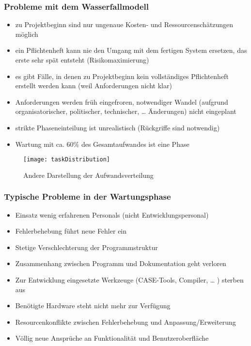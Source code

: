 	\subsubsection{Probleme mit dem Wasserfallmodell}
	\begin{itemize}
		\item zu Projektbeginn sind nur ungenaue Kosten- und Ressourcenschätzungen möglich
		\item ein Pflichtenheft kann nie den Umgang mit dem fertigen System ersetzen, das erste sehr spät entsteht (Risikomaximierung)
		\item es gibt Fälle, in denen zu Projektbeginn kein vollständiges Pflichtenheft erstellt werden kann (weil Anforderungen nicht klar)
		\item Anforderungen werden früh eingefroren, notwendiger Wandel (aufgrund organisatorischer, politischer, technischer, … Änderungen) nicht eingeplant
		\item strikte Phaseneinteilung ist unrealistisch (Rückgriffe sind notwendig)
		\item Wartung mit ca. 60\% des Gesamtaufwandes ist eine Phase
	\end{itemize}
	\begin{figure}[h]
		\centering
		\caption{Andere Darstellung der Aufwandsverteilung}
		\texttt{[image: taskDistribution]}
	\end{figure}
	\subsubsection{Typische Probleme in der Wartungsphase}
	\begin{itemize}
		\item Einsatz wenig erfahrenen Personals (nicht Entwicklungspersonal)
		\item Fehlerbehebung führt neue Fehler ein
		\item Stetige Verschlechterung der Programmstruktur
		\item Zusammenhang zwischen Programm und Dokumentation geht verloren
		\item Zur Entwicklung eingesetzte Werkzeuge (CASE-Tools, Compiler, … ) sterben aus
		\item Benötigte Hardware steht nicht mehr zur Verfügung
		\item Resourcenkonflikte zwischen Fehlerbehebung und Anpassung/Erweiterung
		\item Völlig neue Ansprüche an Funktionalität und Benutzeroberfläche
	\end{itemize}
